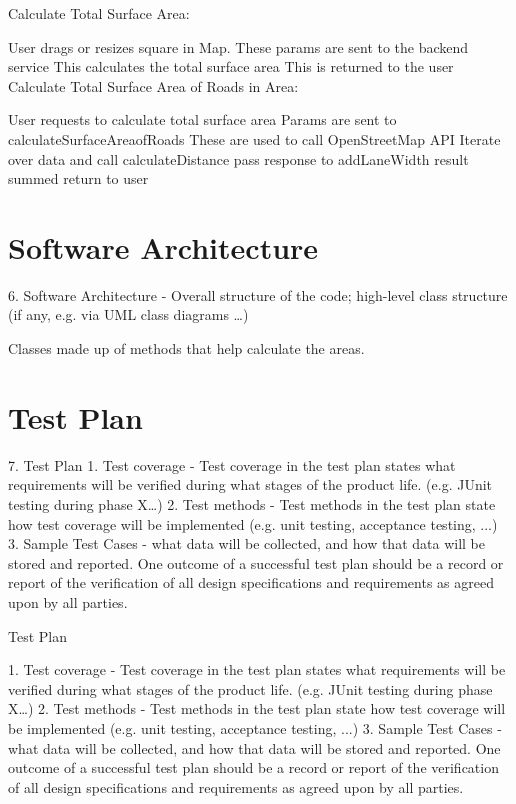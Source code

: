 \documentclass[a4paper,11pt]{article}
\begin{document}
Calculate Total Surface Area:

User drags or resizes square in Map.
These params are sent to the backend service
This calculates the total surface area
This is returned to the user
Calculate Total Surface Area of Roads in Area:

User requests to calculate total surface area
Params are sent to calculateSurfaceAreaofRoads
These are used to call OpenStreetMap API
Iterate over data and call calculateDistance
pass response to addLaneWidth
result summed
return to user


\section{Software Architecture}

6. Software Architecture - Overall structure of the code; high-level class structure (if any, e.g. via UML class diagrams …)



Classes made up of methods that help calculate the areas.

\section{Test Plan}

7. Test Plan
  1. Test coverage - Test coverage in the test plan states what requirements will be verified during what stages of the product life. (e.g. JUnit testing during phase X…)
  2. Test methods - Test methods in the test plan state how test coverage will be implemented (e.g. unit testing, acceptance testing, ...)
  3. Sample Test Cases - what data will be collected, and how that data will be stored and reported. One outcome of a successful test plan should be a record or report of the verification of all design specifications and requirements as agreed upon by all parties.


Test Plan

1. Test coverage - Test coverage in the test plan states what requirements will be verified during what stages of the product life. (e.g. JUnit testing during phase X…)
2. Test methods - Test methods in the test plan state how test coverage will be implemented (e.g. unit testing, acceptance testing, ...)
3. Sample Test Cases - what data will be collected, and how that data will be stored and reported. One outcome of a successful test plan should be a record or report of the verification of all design specifications and requirements as agreed upon by all parties.
\end{document}
